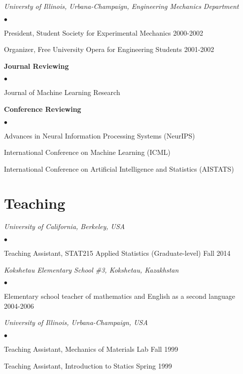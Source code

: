 \documentclass[margin,line]{res}
\newenvironment{list2}{
  \begin{list}{$\bullet$}{%
      \setlength{\itemsep}{0in}
      \setlength{\parsep}{0in} \setlength{\parskip}{0in}
      \setlength{\topsep}{0in} \setlength{\partopsep}{0in}
      \setlength{\leftmargin}{0.2in}}}{\end{list}}
\begin{document}
\begin{resume}
{\em Universty of Illinois, Urbana-Champaign, Engineering Mechanics Department}
\begin{list2}
    \item President, Student Society for Experimental Mechanics \hfill 2000-2002
    \item Organizer, Free University Opera for Engineering Students \hfill 2001-2002
\end{list2}


\textbf{Journal Reviewing}
\begin{list2}
\item Journal of Machine Learning Research
\end{list2}

\textbf{Conference Reviewing}
\begin{list2}
\item Advances in Neural Information Processing Systems (NeurIPS)
\item International Conference on Machine Learning (ICML)
\item International Conference on Artificial Intelligence and Statistics (AISTATS)
\end{list2}


\section{\sc Teaching}

\emph{University of California, Berkeley, USA}
\begin{list2}
\item Teaching Assistant, STAT215 Applied Statistics
(Graduate-level) \hfill Fall 2014
\end{list2}

\emph{Kokshetau Elementary School \#3, Kokshetau, Kazakhstan}
\begin{list2}
\item Elementary school teacher of mathematics and English as a second language
\hfill 2004-2006
\end{list2}

\emph{University of Illinois, Urbana-Champaign, USA}
\begin{list2}
\item Teaching Assistant, Mechanics of Materials Lab \hfill Fall 1999
\item Teaching Assistant, Introduction to Statics \hfill Spring 1999
\end{list2}

\end{resume}
\end{document}

